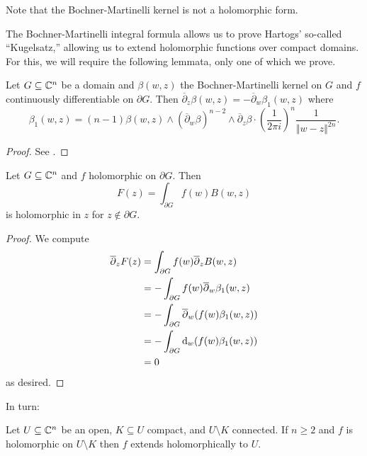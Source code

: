 \begin{remark}
    Note that the Bochner-Martinelli kernel is not a holomorphic form. 
\end{remark}
The Bochner-Martinelli integral formula allows us to prove Hartogs' so-called ``Kugelsatz,'' allowing us to extend holomorphic functions over compact domains. For this, we will require the following lemmata, only one of which we prove. 
\begin{lemma}\label{lem: Kugelsatz lemma 1}
    Let $G\subseteq\mathbb{C}^{n}$ be a domain and $\beta(w,z)$ the Bochner-Martinelli kernel on $G$ and $f$ continuously differentiable on $\partial G$. Then $\overline{\partial}_{z}\beta(w,z)=-\overline{\partial}_{w}\beta_{1}(w,z)$ where
    $$\beta_{1}(w,z)=(n-1)\beta(w,z)\wedge(\overline{\partial}_{w}\beta)^{n-2}\wedge\overline{\partial}_{z}\beta\cdot\left(\frac{1}{2\pi i}\right)^{n}\frac{1}{\Vert w-z\Vert^{2n}}.$$
\end{lemma}
\begin{proof}
    See \cite[\S 4, Prop. 4.9]{Range}.
\end{proof}
\begin{lemma}\label{lem: Kugelsatz lemma 2}
    Let $G\subseteq\mathbb{C}^{n}$ and $f$ holomorphic on $\partial G$. Then 
    $$F(z)=\int_{\partial G}f(w)B(w,z)$$
    is holomorphic in $z$ for $z\notin\partial G$.
\end{lemma}
\begin{proof}
    We compute 
    \begin{align*}
        \overline{\partial}_{z}F(z) &= \int_{\partial G}f(w)\overline{\partial}_{z}B(w,z) \\
        &= -\int_{\partial G}f(w)\overline{\partial}_{w}\beta_{1}(w,z) \\
        &= -\int_{\partial G}\overline{\partial}_{w}(f(w)\beta_{1}(w,z)) \\
        &=  -\int_{\partial G}\mathrm{d}_{w}(f(w)\beta_{1}(w,z)) \\
        &= 0
    \end{align*}
    as desired.
\end{proof}
In turn:
\begin{theorem}\label{thm: Kugelsatz}
    Let $U\subseteq\mathbb{C}^{n}$ be an open, $K\subseteq U$ compact, and $U\setminus K$ connected. If $n\geq 2$ and $f$ is holomorphic on $U\setminus K$ then $f$ extends holomorphically to $U$. 
\end{theorem}

